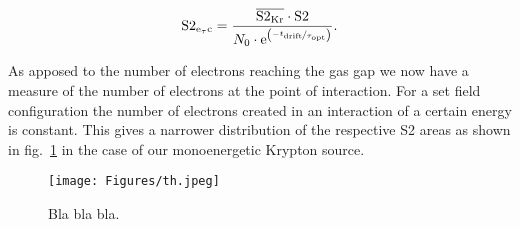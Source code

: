 \begin{equation}
    \mathrm{S2_\mathrm{e_\tau c}} = \frac{ \overline{\mathrm{S2_{Kr}}} \cdot \mathrm{S2} }{ N_0 \cdot \mathrm{e}^{ \left( \nicefrac{-t_\mathrm{drift}}{\tau_\mathrm{opt}} \right)} }.  %
\end{equation}

As apposed to the number of electrons reaching the gas gap we now have a measure of the number of electrons at the point of interaction.
For a set field configuration the number of electrons created in an interaction of a certain energy is constant.
This gives a narrower distribution of the respective S2 areas as shown in fig.~\ref{fig:s2-area-hist-after-eltc} in the case of our monoenergetic Krypton source.


\begin{figure}
    \centering
    \texttt{[image: Figures/th.jpeg]}  %
    \caption[S2 area]{
        Bla bla bla.
    }
    \label{fig:s2-area-hist-after-eltc}
\end{figure}


